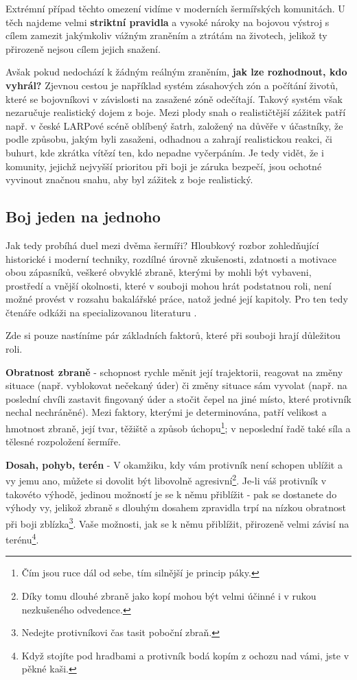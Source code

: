 Extrémní případ těchto omezení vidíme v moderních šermířských komunitách. U těch najdeme velmi \textbf{striktní pravidla} a vysoké nároky na bojovou výstroj s cílem zamezit jakýmkoliv vážným zraněním a ztrátám na životech, jelikož ty přirozeně nejsou cílem jejich snažení. 

Avšak pokud nedochází k žádným reálným zraněním, \textbf{jak lze rozhodnout, kdo vyhrál?} Zjevnou cestou je například systém zásahových zón a počítání životů, které se bojovníkovi v závislosti na zasažené zóně odečítají. Takový systém však nezaručuje realistický dojem z boje. Mezi plody snah o realističtější zážitek patří např. v české LARPové scéně oblíbený šatrh\cite{Satrh}, založený na důvěře v účastníky, že podle způsobu, jakým byli zasaženi, odhadnou a zahrají realistickou reakci, či buhurt, kde zkrátka vítězí ten, kdo nepadne vyčerpáním. Je tedy vidět, že i komunity, jejichž nejvyšší prioritou při boji je záruka bezpečí, jsou ochotné vyvinout značnou snahu, aby byl zážitek z boje realistický.

\subsection{Boj jeden na jednoho}
Jak tedy probíhá duel mezi dvěma šermíři? Hloubkový rozbor zohledňující historické i moderní techniky, rozdílné úrovně zkušenosti, zdatnosti a motivace obou zápasníků, veškeré obvyklé zbraně, kterými by mohli být vybaveni, prostředí a vnější okolnosti, které v souboji mohou hrát podstatnou roli, není možné provést v rozsahu bakalářské práce, natož jedné její kapitoly. Pro ten tedy čtenáře odkáži na specializovanou literaturu \cite{KunstDesFechtens} \cite{FightingWithTheGermanLongsword} \cite{ModernHEMA}.  

Zde si pouze nastíníme pár základních faktorů, které při souboji hrají důležitou roli.

\textbf{Obratnost zbraně} - schopnost rychle měnit její trajektorii, reagovat na změny situace (např. vyblokovat nečekaný úder) či změny situace sám vyvolat (např. na poslední chvíli zastavit fingovaný úder a stočit čepel na jiné místo, které protivník nechal nechráněné). Mezi faktory, kterými je determinována, patří velikost a hmotnost zbraně, její tvar, těžiště a způsob úchopu\footnote{Čím jsou ruce dál od sebe, tím silnější je princip páky.}; v neposlední řadě také síla a tělesné rozpoložení šermíře.

\textbf{Dosah, pohyb, terén} - V okamžiku, kdy vám protivník není schopen ublížit a vy jemu ano, můžete si dovolit být libovolně agresivní\footnote{Díky tomu dlouhé zbraně jako kopí mohou být velmi účinné i v rukou nezkušeného odvedence.}. Je-li váš protivník v takovéto výhodě, jedinou možností je se k němu přiblížit - pak se dostanete do výhody vy, jelikož zbraně s dlouhým dosahem zpravidla trpí na nízkou obratnost při boji zblízka\footnote{Nedejte protivníkovi čas tasit poboční zbraň.}. Vaše možnosti, jak se k němu přiblížit, přirozeně velmi závisí na terénu\footnote{Když stojíte pod hradbami a protivník bodá kopím z ochozu nad vámi, jste v pěkné kaši.}. 

